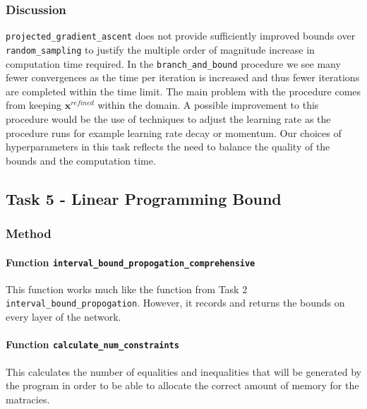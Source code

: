 \documentclass[11pt]{article}
\begin{document}
\subsubsection{Discussion}
\texttt{projected\_gradient\_ascent} does not provide sufficiently improved bounds over \texttt{random\_sampling} to justify the multiple order of magnitude increase in computation time required.
In the \texttt{branch\_and\_bound} procedure we see many fewer convergences as the time per iteration is increased and thus fewer iterations are completed within the time limit.
The main problem with the procedure comes from keeping $\boldsymbol{x}^{refined}$ within the domain.
A possible improvement to this procedure would be the use of techniques to adjust the learning rate as the procedure runs for example learning rate decay or momentum.
Our choices of hyperparameters in this task reflects the need to balance the quality of the bounds and the computation time.


\subsection{Task 5 - Linear Programming Bound}
\subsubsection{Method}
\paragraph{Function \texttt{interval\_bound\_propogation\_comprehensive}}
This function works much like the function from Task 2 \texttt{interval\_bound\_propogation}. However, it records and returns the bounds on every layer of the network.

\paragraph{Function \texttt{calculate\_num\_constraints}} This calculates the number of equalities and inequalities that will be generated by the program in order to be able to allocate the correct amount of memory for the matracies.
\end{document}
